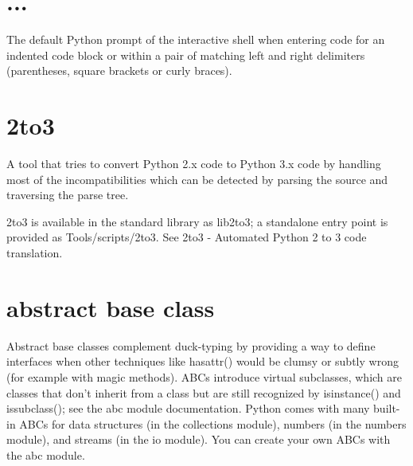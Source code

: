 \documentclass[12pt,a4paper,final,twoside,onecolumn,titlepage]{book}
\begin{document}
\section{...}
The default Python prompt of the interactive shell when entering code for an indented code block or within a pair of matching left and right delimiters (parentheses, square brackets or curly braces).

\section{2to3}
A tool that tries to convert Python 2.x code to Python 3.x code by handling most of the incompatibilities which can be detected by parsing the source and traversing the parse tree.

2to3 is available in the standard library as lib2to3; a standalone entry point is provided as Tools/scripts/2to3. See 2to3 - Automated Python 2 to 3 code translation.

\section{abstract base class}
Abstract base classes complement duck-typing by providing a way to define interfaces when other techniques like hasattr() would be clumsy or subtly wrong (for example with magic methods). ABCs introduce virtual subclasses, which are classes that don’t inherit from a class but are still recognized by isinstance() and issubclass(); see the abc module documentation. Python comes with many built-in ABCs for data structures (in the collections module), numbers (in the numbers module), and streams (in the io module). You can create your own ABCs with the abc module.
\end{document}
